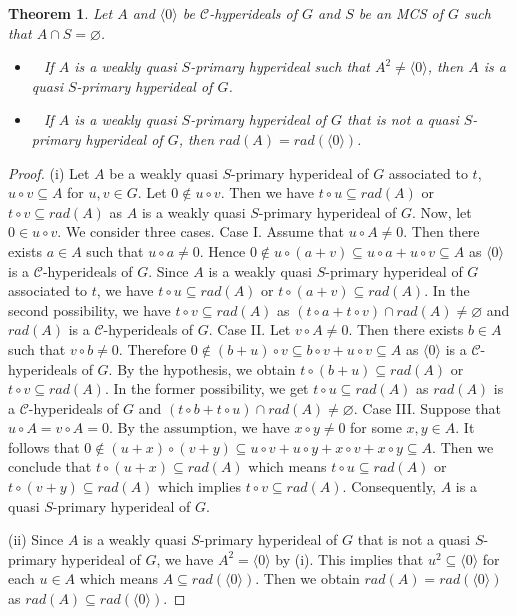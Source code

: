 \documentclass[preprint,review,10pt]{amsart}
\newtheorem{theorem}{Theorem}[section]
\theoremstyle{definition}
\theoremstyle{remark}
\numberwithin{equation}{section}
\begin{document}
\begin{theorem} \label{24}
Let $A$ and $\langle 0 \rangle$ be     $\mathcal{C}$-hyperideals of $G$ and $S$ be an MCS of $G$ such that $A \cap S=\varnothing$. 
\begin{itemize}
\item[\rm{(i)}]~ If $A$ is a  weakly quasi $S$-primary hyperideal such that  $A^2 \neq \langle 0 \rangle$, then $A$ is a quasi $S$-primary hyperideal of $G$. 
\item[\rm{(ii)}]~ If  $A$ is a  weakly quasi $S$-primary hyperideal  of $G$   that   is not a quasi $S$-primary hyperideal of $G$, then $rad(A)=rad(\langle 0 \rangle)$.
\end{itemize}
\end{theorem}
\begin{proof}
(i) Let $A$ be a  weakly quasi $S$-primary hyperideal of $G$ associated to $t$, $u \circ v \subseteq A$ for $u,v \in G$. Let  $0 \notin u \circ v $. Then we have $t \circ u \subseteq rad(A)$ or $t \circ v \subseteq rad(A)$ as  $A$ is a  weakly quasi $S$-primary hyperideal of $G$. Now, let $0 \in  u \circ v $. We consider three cases. Case I. Assume that $u \circ A \neq 0$. Then there exists $a \in A$ such that $ u \circ a \neq 0$.  Hence $0 \notin u \circ (a+v) \subseteq u \circ a + u \circ v \subseteq A$ as $\langle 0 \rangle$  is    a $\mathcal{C}$-hyperideals of $G$. Since $A$ is a  weakly quasi $S$-primary hyperideal of $G$ associated to $t$, we have $t \circ u \subseteq rad(A)$ or $t \circ (a+v) \subseteq rad(A)$. In the second possibility, we have $t \circ v \subseteq rad(A)$ as $(t \circ a+ t \circ v) \cap rad(A) \neq \varnothing$ and $rad(A)$ is a $\mathcal{C}$-hyperideals of $G$. Case II. Let $v \circ A \neq 0$. Then there exists $b \in A$ such that $ v \circ b \neq 0$. Therefore $0 \notin (b+u) \circ v \subseteq b \circ v + u \circ v \subseteq A$ as $\langle 0 \rangle$  is    a $\mathcal{C}$-hyperideals of $G$. By the hypothesis, we obtain $t \circ (b+u) \subseteq rad(A)$ or $t \circ v \subseteq rad(A)$. In the former possibility, we get $t \circ u \subseteq rad(A)$ as $rad(A)$ is a $\mathcal{C}$-hyperideals of $G$ and $(t \circ b+ t \circ u) \cap rad(A) \neq \varnothing$. Case III. Suppose that $u \circ A=v \circ A=0$. By the assumption, we have $x \circ y \neq 0$ for some $x,y \in A$. It follows that $0 \notin   (u+x) \circ (v+y) \subseteq u \circ v+u \circ y+x \circ v+x \circ y \subseteq A $. Then we conclude that $t \circ (u+x) \subseteq rad(A)$ which means $t \circ u \subseteq rad(A)$ or $t \circ (v+y) \subseteq rad(A)$ which implies $t \circ v \subseteq rad(A)$. Consequently, $A$ is a quasi $S$-primary hyperideal of $G$.

(ii) Since $A$ is a  weakly quasi $S$-primary hyperideal  of $G$ that   is not a quasi $S$-primary hyperideal of $G$, we have $A^2=\langle 0 \rangle$ by (i). This implies that $u^2 \subseteq \langle 0 \rangle$ for each $u \in A$ which means $A \subseteq rad(\langle 0 \rangle)$. Then we obtain $rad(A)=rad(\langle 0 \rangle)$ as $rad(A) \subseteq rad(\langle 0 \rangle)$.
\end{proof}
\end{document}
